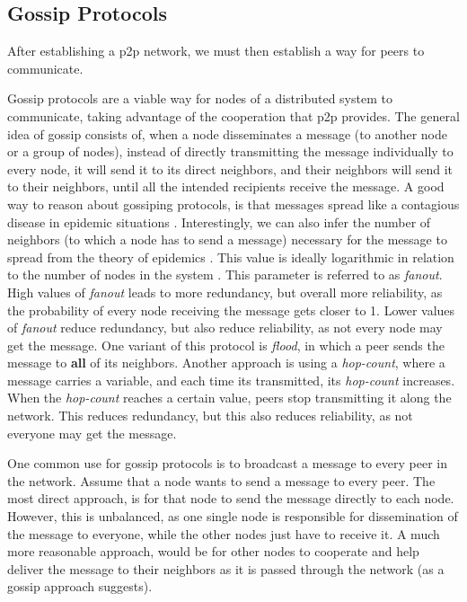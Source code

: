\subsection{Gossip Protocols}
\label{ssec:gossip_protocols}
\par After establishing a \gls{p2p} network, we must then establish a way for peers to communicate.
\par Gossip protocols are a viable way for nodes of a distributed system to communicate, taking advantage of the cooperation that \gls{p2p} provides. The general idea of gossip consists of, when a node disseminates a message (to another node or a group of nodes), instead of directly transmitting the message individually to every node, it will send it to its direct neighbors, and their neighbors will send it to their neighbors, until all the intended recipients receive the message. A good way to reason about gossiping protocols, is that messages spread like a contagious disease in epidemic situations \cite{Bakhshi2007}. Interestingly, we can also infer the number of neighbors (to which a node has to send a message) necessary for the message to spread from the theory of epidemics \cite{Eugster}. This value is ideally logarithmic in relation to the number of nodes in the system \cite{Leitao2010}. %
This parameter is referred to as \textit{fanout}. High values of \textit{fanout} leads to more redundancy, but overall more reliability, as the probability of every node receiving the message gets closer to 1. Lower values of \textit{fanout} reduce redundancy, but also reduce reliability, as not every node may get the message. One variant of this protocol is \textit{flood}, in which a peer sends the message to \textbf{all} of its neighbors. Another approach is using a \textit{hop-count}, where a message carries a variable, and each time its transmitted, its \textit{hop-count} increases. When the \textit{hop-count} reaches a certain value, peers stop transmitting it along the network. This reduces redundancy, but this also reduces reliability, as not everyone may get the message.
\par One common use for gossip protocols is to broadcast a message to every peer in the network. Assume that a node wants to send a message to every peer. The most direct approach, is for that node to send the message directly to each node. However, this is unbalanced, as one single node is responsible for dissemination of the message to everyone, while the other nodes just have to receive it. A much more reasonable approach, would be for other nodes to cooperate and help deliver the message to their neighbors as it is passed through the network (as a gossip approach suggests).
